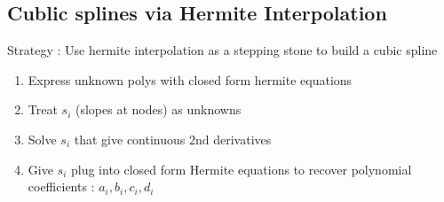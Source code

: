 \documentclass[twoside]{article}
\begin{document}
\subsection{Cublic splines via Hermite Interpolation}
Strategy : Use hermite interpolation as a stepping stone to build a cubic spline

\begin{enumerate}
\item Express unknown polys with closed form hermite equations
\item Treat \(s_i\) (slopes at nodes) as unknowns
\item Solve \(s_i\) that give continuous 2nd derivatives 
\item Give \(s_i\) plug into closed form Hermite equations to recover polynomial coefficients : \(a_i, b_i, c_i, d_i\)
\end{enumerate}
\end{document}
